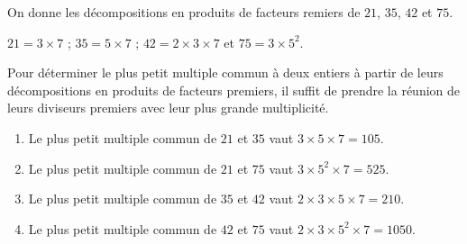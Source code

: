     On donne les décompositions en produits de facteurs remiers de $21$, $35$, $42$ et $75$.

    $21=3\times 7$ ; $35=5\times 7$ ; $42=2\times 3\times 7$ et $75=3\times 5^2$.

    Pour déterminer le plus petit multiple commun à deux entiers à partir de leurs décompositions en produits de facteurs premiers,
    il suffit de prendre la réunion de leurs diviseurs premiers avec leur plus grande multiplicité.

    \begin{enumerate}
        \item Le plus petit multiple commun de $21$ et $35$ vaut $3\times 5\times 7 = 105$.
        \item Le plus petit multiple commun de $21$ et $75$ vaut $3\times 5^2\times 7 = 525$.
        \item Le plus petit multiple commun de $35$ et $42$ vaut $2\times 3\times 5\times 7 = 210$.
        \item Le plus petit multiple commun de $42$ et $75$ vaut $2\times 3\times 5^2\times 7 = \num{1050}$.
    \end{enumerate}
